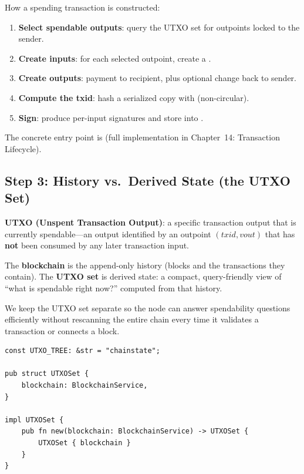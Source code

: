 How a spending transaction is constructed:
\begin{enumerate}
  \item \textbf{Select spendable outputs}: query the UTXO set for outpoints locked to the sender.
  \item \textbf{Create inputs}: for each selected outpoint, create a .
  \item \textbf{Create outputs}: payment to recipient, plus optional change back to sender.
  \item \textbf{Compute the txid}: hash a serialized copy with  (non-circular).
  \item \textbf{Sign}: produce per-input signatures and store into .
\end{enumerate}

The concrete entry point is 
(full implementation in Chapter~14: Transaction Lifecycle).

\subsection{Step 3: History vs.\ Derived State (the UTXO Set)}
\label{sec:step3-utxo}

\textbf{UTXO (Unspent Transaction Output)}: a specific transaction
output that is currently spendable---an output identified by an outpoint
$(txid, vout)$ that has \textbf{not} been consumed by any later
transaction input.

The \textbf{blockchain} is the append-only history (blocks and the
transactions they contain). The \textbf{UTXO set} is derived state: a
compact, query-friendly view of ``what is spendable right now?'' computed
from that history.

We keep the UTXO set separate so the node can answer spendability
questions efficiently without rescanning the entire chain every time it
validates a transaction or connects a block.

\begin{listing}[htbp]
\caption{UTXOSet struct ()}
\label{lst:9-3-utxo}
\begin{verbatim}
const UTXO_TREE: &str = "chainstate";

pub struct UTXOSet {
    blockchain: BlockchainService,
}

impl UTXOSet {
    pub fn new(blockchain: BlockchainService) -> UTXOSet {
        UTXOSet { blockchain }
    }
}
\end{verbatim}
\end{listing}

